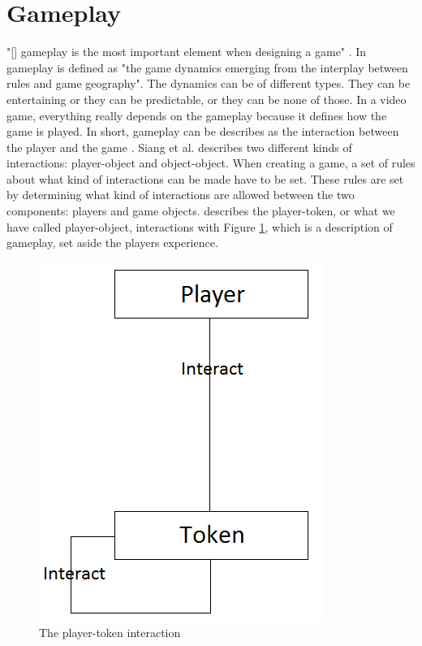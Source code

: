 \section{Gameplay}

"[] gameplay is the most important element when designing a game" \cite{umlapproach}.  In \cite{understandingvg} gameplay is defined as "the game dynamics emerging from the interplay between rules and game geography". The dynamics can be of different types. They can be entertaining or they can be predictable, or they can be none of those. In a video game, everything really depends on the gameplay because it defines how the game is played. In short, gameplay can be describes as the interaction between the player and the game \cite{umlapproach}. Siang et al. describes two different kinds of interactions: player-object and object-object. When creating a game, a set of rules about what kind of interactions can be made have to be set. These rules are set by determining what kind of interactions are allowed between the two components: players and game objects. \cite{umlapproach} describes the player-token, or what we have called player-object, interactions with Figure \ref{fig:playertoken}, which is a description of gameplay, set aside the players experience.
\begin{figure}
\begin{center}
\includegraphics[scale=0.5]{playertoken}
\caption[The player-token interaction]{The player-token interaction \cite{umlapproach}}
\label{fig:playertoken}
\end{center}
\end{figure} 


